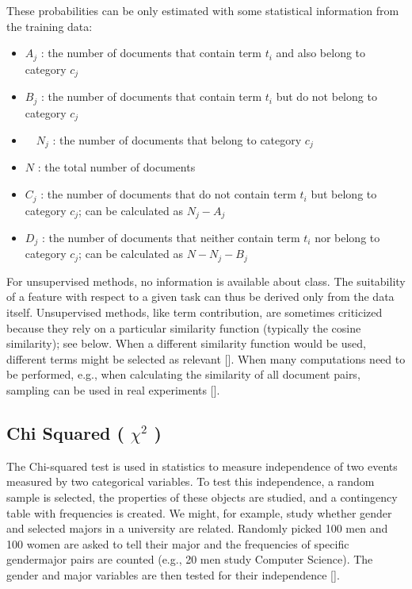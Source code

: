 These probabilities can be only estimated with some statistical information from the training data:

\begin{itemize}
  \item $A_{j}$ : the number of documents that contain term $t_{i}$ and also belong to category $c_{j}$
  \item $B_{j}$ : the number of documents that contain term $t_{i}$ but do not belong to category $c_{j}$
  \item $\quad N_{j}$ : the number of documents that belong to category $c_{j}$
  \item $N$ : the total number of documents
  \item $C_{j}$ : the number of documents that do not contain term $t_{i}$ but belong to category $c_{j}$; can be calculated as $N_{j}-A_{j}$
  \item $D_{j}$ : the number of documents that neither contain term $t_{i}$ nor belong to category $c_{j}$; can be calculated as $N-N_{j}-B_{j}$
\end{itemize}

For unsupervised methods, no information is available about class. The suitability of a feature with respect to a given task can thus be derived only from the data itself. Unsupervised methods, like term contribution, are sometimes criticized because they rely on a particular similarity function (typically the cosine similarity); see below. When a different similarity function would be used, different terms might be selected as relevant [\cite{ref7}]. When many computations need to be performed, e.g., when calculating the similarity of all document pairs, sampling can be used in real experiments [\cite{ref179}].

\subsection{\texorpdfstring{Chi Squared ( $\chi^{2}$ )}{Chi Squared (Chi-2)}}
The Chi-squared test is used in statistics to measure independence of two events measured by two categorical variables. To test this independence, a random sample is selected, the properties of these objects are studied, and a contingency table with frequencies is created. We might, for example, study whether gender and selected majors in a university are related. Randomly picked 100 men and 100 women are asked to tell their major and the frequencies of specific gendermajor pairs are counted (e.g., 20 men study Computer Science). The gender and major variables are then tested for their independence [\cite{ref264}].

